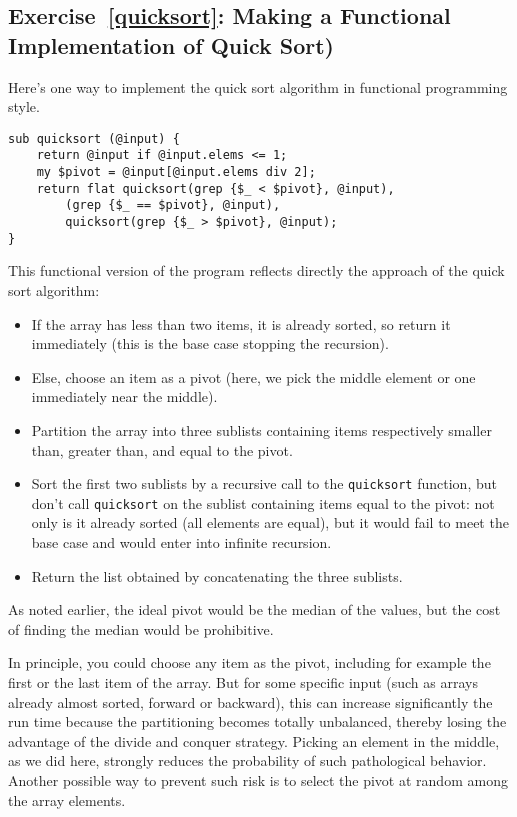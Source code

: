 \subsection{Exercise~\ref{quicksort}: Making a Functional Implementation of Quick Sort)}
\label{sol_quicksort}

Here's one way to implement the quick sort algorithm in 
functional programming style.

\begin{verbatim}
sub quicksort (@input) {
    return @input if @input.elems <= 1;
    my $pivot = @input[@input.elems div 2];
    return flat quicksort(grep {$_ < $pivot}, @input), 
        (grep {$_ == $pivot}, @input), 
        quicksort(grep {$_ > $pivot}, @input);
}
\end{verbatim}

This functional version of the program reflects directly 
the approach of the quick sort algorithm:
\begin{itemize}
\item If the  array has less than two items, it is already 
sorted, so return it immediately (this is the base case 
stopping the recursion).
\item Else, choose an item as a pivot (here, we pick the 
middle element or one immediately near the middle).
\item Partition the array into three sublists containing 
items respectively smaller than, greater than, and equal to 
the pivot.
\item Sort the first two sublists by a recursive call to 
the \verb'quicksort' function, but don't call \verb'quicksort' 
on the sublist containing items equal to the pivot: not only is 
it already sorted (all elements are equal), but it would fail 
to meet the base case and would enter into infinite recursion.
\item  Return the list obtained by concatenating the three 
sublists.
\end{itemize}

As noted earlier, the ideal pivot would be the median of the 
values, but the cost of finding the median would be prohibitive.

In principle, you could choose any item as the pivot, including 
for example the first or the last item of the array. But for 
some specific input (such as arrays already almost sorted, 
forward or backward), this can increase significantly the 
run time because the partitioning becomes totally unbalanced, 
thereby losing the advantage of the divide and conquer strategy. 
Picking an element in the middle, as we did here, strongly reduces 
the probability of such pathological behavior. Another possible way 
to prevent such risk is to select the pivot at random among 
the array elements.


